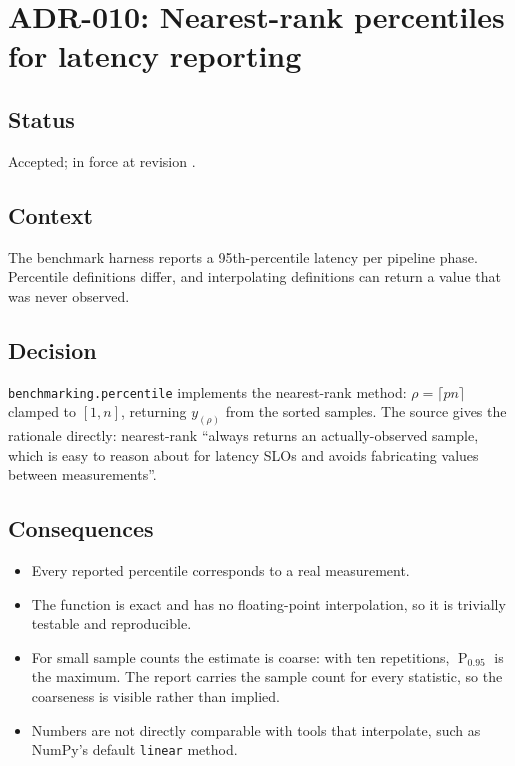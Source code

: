 \section{ADR-010: Nearest-rank percentiles for latency reporting}
\label{adr:010}

\subsection*{Status}

Accepted; in force at revision \texttt{\projectrevisionshort}.

\subsection*{Context}

The benchmark harness reports a 95th-percentile latency per pipeline phase.
Percentile definitions differ, and interpolating definitions can return a value
that was never observed.

\subsection*{Decision}

\texttt{benchmarking.percentile} implements the nearest-rank method:
$\rho = \lceil p n \rceil$ clamped to $[1, n]$, returning $y_{(\rho)}$ from the
sorted samples. The source gives the rationale directly: nearest-rank ``always
returns an actually-observed sample, which is easy to reason about for latency
SLOs and avoids fabricating values between measurements''.

\subsection*{Consequences}

\begin{itemize}
  \item Every reported percentile corresponds to a real measurement.
  \item The function is exact and has no floating-point interpolation, so it is
    trivially testable and reproducible.
  \item For small sample counts the estimate is coarse: with ten repetitions,
    $\operatorname{P}_{0.95}$ is the maximum. The report carries the sample
    count for every statistic, so the coarseness is visible rather than
    implied.
  \item Numbers are not directly comparable with tools that interpolate, such
    as NumPy's default \texttt{linear} method.
\end{itemize}

